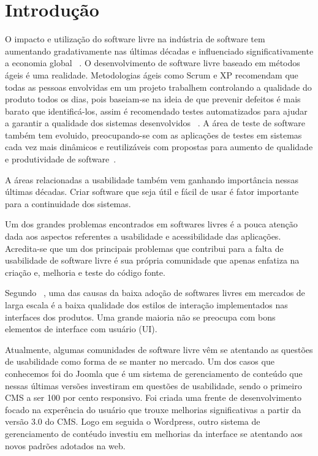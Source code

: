 	\chapter{Introdução}

	O impacto e utilização do software livre na indústria de software tem aumentando gradativamente nas últimas décadas e influenciado significativamente a economia global ~\cite{benkler2006}. 
	O desenvolvimento de software livre baseado em métodos ágeis é uma realidade. Metodologias ágeis como Scrum e XP recomendam que todas as pessoas envolvidas em um projeto trabalhem controlando a qualidade do produto todos os dias, pois baseiam-se na ideia de que prevenir defeitos é mais barato que identificá-los, assim é recomendado testes automatizados para ajudar a garantir a qualidade dos sistemas desenvolvidos ~\cite{bernardo2011}.
	A área de teste de software também tem evoluido, preocupando-se com as aplicações de testes	em sistemas cada vez mais dinâmicos e reutilizáveis com propostas para aumento de qualidade e produtividade de software~\cite{vicente2010}.

	A áreas relacionadas a usabilidade também vem ganhando importância nessas últimas décadas. Criar software que seja útil e fácil de usar é fator importante para a continuidade dos sistemas.

	Um dos grandes problemas encontrados em softwares livres é a pouca atenção dada aos aspectos referentes a usabilidade e acessibilidade das aplicações. Acredita-se que um dos principais problemas que contribui para a falta de usabilidade de software livre é sua própria comunidade que apenas enfatiza na criação e, melhoria e teste do código fonte.  

Segundo ~, uma das causas da baixa adoção de softwares livres em mercados de larga escala é a baixa qualidade dos estilos de interação implementados nas interfaces dos produtos. Uma grande maioria não se preocupa com bons elementos de interface com usuário (UI). 

Atualmente, algumas comunidades de software livre vêm se atentando as questões de usabilidade como forma de se manter no mercado. Um dos casos que conhecemos foi do Joomla que é um sistema de gerenciamento de conteúdo  que nessas últimas versões investiram em questões de usabilidade, sendo o primeiro CMS a ser 100 por cento responsivo. Foi criada uma frente de desenvolvimento focado na experência do usuário que trouxe melhorias significativas a partir da versão 3.0 do CMS. Logo em seguida o Wordpress, outro sistema de gerenciamento de contéudo investiu em melhorias da interface se atentando aos novos padrões adotados na web.

